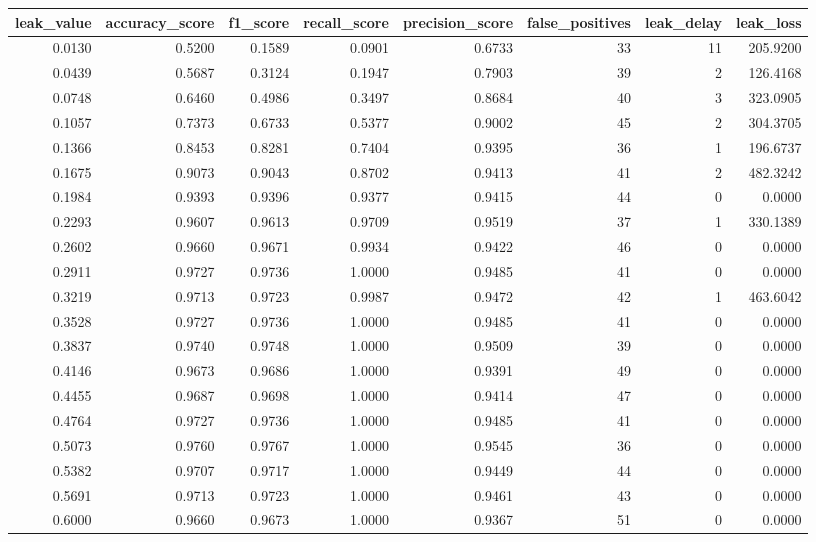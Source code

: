 \begin{tabular}{rrrrrrrr}
\toprule
leak\_value & accuracy\_score & f1\_score & recall\_score & precision\_score & false\_positives & leak\_delay & leak\_loss \\
\midrule
0.0130 & 0.5200 & 0.1589 & 0.0901 & 0.6733 & 33 & 11 & 205.9200 \\
0.0439 & 0.5687 & 0.3124 & 0.1947 & 0.7903 & 39 & 2 & 126.4168 \\
0.0748 & 0.6460 & 0.4986 & 0.3497 & 0.8684 & 40 & 3 & 323.0905 \\
0.1057 & 0.7373 & 0.6733 & 0.5377 & 0.9002 & 45 & 2 & 304.3705 \\
0.1366 & 0.8453 & 0.8281 & 0.7404 & 0.9395 & 36 & 1 & 196.6737 \\
0.1675 & 0.9073 & 0.9043 & 0.8702 & 0.9413 & 41 & 2 & 482.3242 \\
0.1984 & 0.9393 & 0.9396 & 0.9377 & 0.9415 & 44 & 0 & 0.0000 \\
0.2293 & 0.9607 & 0.9613 & 0.9709 & 0.9519 & 37 & 1 & 330.1389 \\
0.2602 & 0.9660 & 0.9671 & 0.9934 & 0.9422 & 46 & 0 & 0.0000 \\
0.2911 & 0.9727 & 0.9736 & 1.0000 & 0.9485 & 41 & 0 & 0.0000 \\
0.3219 & 0.9713 & 0.9723 & 0.9987 & 0.9472 & 42 & 1 & 463.6042 \\
0.3528 & 0.9727 & 0.9736 & 1.0000 & 0.9485 & 41 & 0 & 0.0000 \\
0.3837 & 0.9740 & 0.9748 & 1.0000 & 0.9509 & 39 & 0 & 0.0000 \\
0.4146 & 0.9673 & 0.9686 & 1.0000 & 0.9391 & 49 & 0 & 0.0000 \\
0.4455 & 0.9687 & 0.9698 & 1.0000 & 0.9414 & 47 & 0 & 0.0000 \\
0.4764 & 0.9727 & 0.9736 & 1.0000 & 0.9485 & 41 & 0 & 0.0000 \\
0.5073 & 0.9760 & 0.9767 & 1.0000 & 0.9545 & 36 & 0 & 0.0000 \\
0.5382 & 0.9707 & 0.9717 & 1.0000 & 0.9449 & 44 & 0 & 0.0000 \\
0.5691 & 0.9713 & 0.9723 & 1.0000 & 0.9461 & 43 & 0 & 0.0000 \\
0.6000 & 0.9660 & 0.9673 & 1.0000 & 0.9367 & 51 & 0 & 0.0000 \\
\bottomrule
\end{tabular}
